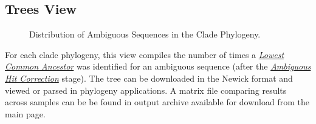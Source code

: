 \documentclass[letterpaper,10pt,english]{sphinxmanual}
\begin{document}
\subsection{Trees View}
\label{Web:trees-view}\begin{figure}[htbp]
\centering
\capstart

\caption{Distribution of Ambiguous Sequences in the Clade Phylogeny.}\end{figure}

For each clade phylogeny, this view compiles the number of times a {\hyperref[defs:lca]{\emph{Lowest Common Ancestor}}}
was identified for an ambiguous sequence (after the {\hyperref[defs:multiple-hits]{\emph{Ambiguous Hit Correction}}} stage).
The tree can be downloaded in the Newick format and viewed or parsed in phylogeny
applications. A matrix file comparing results across samples can be be found in
output archive available for download from the main page.
\end{document}

